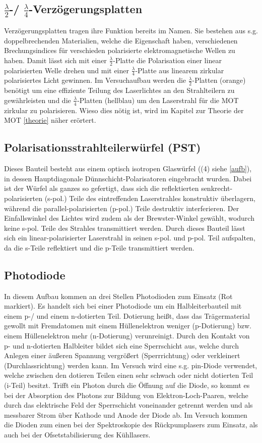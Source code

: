 \documentclass[twoside,colorback,accentcolor=tud4c,11pt]{tudreport}
\begin{document}
\subsection{$\frac{\lambda}{2}$-/ $\frac{\lambda}{4}$-Verzögerungsplatten}
Verzögerungsplatten tragen ihre Funktion bereits im Namen. Sie bestehen aus s.g. doppelbrechenden Materialien, welche die Eigenschaft haben, verschiedenen Brechungsindices für verschieden polarisierte elektromagnetische Wellen zu haben. Damit lässt sich mit einer $\frac{\lambda}{2}$-Platte die Polarisation einer linear polarisierten Welle drehen und mit einer $\frac{\lambda}{4}$-Platte aus linearem zirkular polarisiertes Licht gewinnen. Im Versuchaufbau werden die $\frac{\lambda}{2}$-Platten (orange) benötigt um eine effiziente Teilung des Laserlichtes an den Strahlteilern zu gewährleisten und die $\frac{\lambda}{4}$-Platten (hellblau) um den Laserstrahl für die MOT zirkular zu polarisieren. Wieso dies nötig ist, wird im Kapitel zur Theorie der MOT \ref{theorie} näher erörtert.
\subsection{Polarisationsstrahlteilerwürfel (PST)}
Dieses Bauteil besteht aus einem optisch isotropen Glaswürfel ((4) siehe \ref{aufb}), in dessen Hauptdiagonale Dünnschicht-Polarisatoren eingebracht wurden. Dabei ist der Würfel als ganzes so gefertigt, dass sich die reflektierten senkrecht-polarisierten (s-pol.) Teile des eintreffenden Laserstrahles konstruktiv überlagern, während die parallel-polarisierten (p-pol.) Teile destruktiv interferieren. Der Einfallswinkel des Lichtes wird zudem als der Brewster-Winkel gewählt, wodurch keine s-pol. Teile des Strahles transmittiert werden. Durch dieses Bauteil lässt sich ein linear-polarisierter Laserstrahl in seinen s-pol. und p-pol. Teil aufspalten, da die s-Teile reflektiert und die p-Teile transmittiert werden.
\subsection{Photodiode}
In diesem Aufbau kommen an drei Stellen Photodioden zum Einsatz (Rot markiert). Es handelt sich bei einer Photodiode um ein Halbleiterbauteil mit einem p-/ und einem n-dotierten Teil. Dotierung heißt, dass das Trägermaterial gewollt mit Fremdatomen mit einem Hüllenelektron weniger (p-Dotierung) bzw. einem Hüllenelektron mehr (n-Dotierung) verunreinigt. Durch den Kontakt von p- und n-dotierten Halbleiter bildet sich eine Sperrschicht aus, welche durch Anlegen einer äußeren Spannung vergrößert (Sperrrichtung) oder verkleinert (Durchlassrichtung) werden kann. Im Versuch wird eine s.g. pin-Diode verwendet, welche zwischen den dotieren Teilen einen sehr schwach oder nicht dotierten Teil (i-Teil) besitzt. Trifft ein Photon durch die Öffnung auf die Diode, so kommt es bei der Absorption des Photons zur Bildung von Elektron-Loch-Paaren, welche durch das elektrische Feld der Sperrschicht voneinander getrennt werden und als messbarer Strom über Kathode und Anode der Diode ab. Im Versuch kommen die Dioden zum einen bei der Spektroskopie des Rückpumplasers zum Einsatz, als auch bei der Ofsetstabilisierung des Kühllasers.
\end{document}
